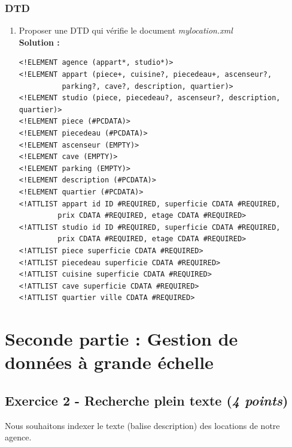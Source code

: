 \documentclass[9pt,a4paper]{article}
\newenvironment{solution}[0]{
~\\ \color{red} \textbf{Solution :}\color{black}}{%
}
\begin{document}
\subsubsection*{DTD}

\begin{enumerate}
  \item[7.] Proposer une DTD qui vérifie le document \textit{mylocation.xml}
\begin{solution}
\begin{verbatim}
<!ELEMENT agence (appart*, studio*)>
<!ELEMENT appart (piece+, cuisine?, piecedeau+, ascenseur?,
          parking?, cave?, description, quartier)>
<!ELEMENT studio (piece, piecedeau?, ascenseur?, description, quartier)>
<!ELEMENT piece (#PCDATA)>
<!ELEMENT piecedeau (#PCDATA)>
<!ELEMENT ascenseur (EMPTY)>
<!ELEMENT cave (EMPTY)>
<!ELEMENT parking (EMPTY)>
<!ELEMENT description (#PCDATA)>
<!ELEMENT quartier (#PCDATA)>
<!ATTLIST appart id ID #REQUIRED, superficie CDATA #REQUIRED,
         prix CDATA #REQUIRED, etage CDATA #REQUIRED> 
<!ATTLIST studio id ID #REQUIRED, superficie CDATA #REQUIRED,
         prix CDATA #REQUIRED, etage CDATA #REQUIRED>
<!ATTLIST piece superficie CDATA #REQUIRED>
<!ATTLIST piecedeau superficie CDATA #REQUIRED>
<!ATTLIST cuisine superficie CDATA #REQUIRED>
<!ATTLIST cave superficie CDATA #REQUIRED>
<!ATTLIST quartier ville CDATA #REQUIRED>
\end{verbatim}
\end{solution}
\end{enumerate}

\section*{Seconde partie : Gestion de donn\'ees à grande \'echelle}

\subsection*{Exercice 2 - Recherche plein texte ({\it 4 points})}

Nous souhaitons indexer le texte (balise description) des locations de notre agence.
\end{document}
